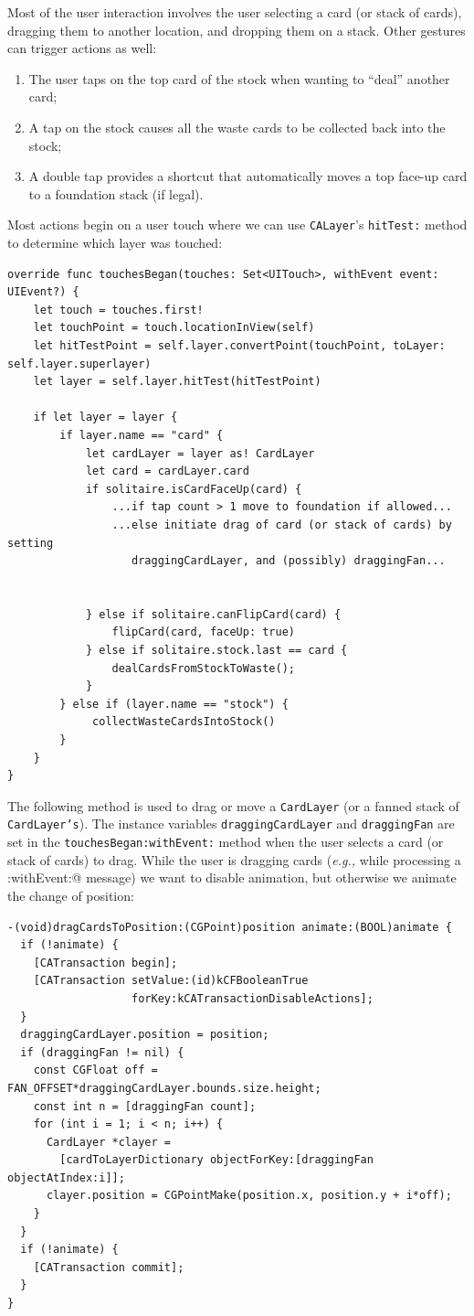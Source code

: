 \documentclass[11pt]{article}
\begin{document}
Most of the user interaction involves the user selecting a card (or stack
of cards), dragging them to another location, and dropping them on
a stack. Other gestures can trigger actions as well:
\begin{enumerate}
\item The user taps on the top card of the stock when wanting to
  ``deal'' another card;
\item A tap on the stock causes all the waste cards to be collected
  back into the stock;
\item A double tap provides a shortcut that automatically moves a
  top face-up card to a foundation stack (if legal).
\end{enumerate}
Most actions begin on a user touch where we can use 
{\tt CALayer}'s {\tt hitTest:} method to determine which layer was touched:
\begin{verbatim}
override func touchesBegan(touches: Set<UITouch>, withEvent event: UIEvent?) {
    let touch = touches.first!
    let touchPoint = touch.locationInView(self)
    let hitTestPoint = self.layer.convertPoint(touchPoint, toLayer: self.layer.superlayer)
    let layer = self.layer.hitTest(hitTestPoint)
        
    if let layer = layer {
        if layer.name == "card" {
            let cardLayer = layer as! CardLayer
            let card = cardLayer.card
            if solitaire.isCardFaceUp(card) {
                ...if tap count > 1 move to foundation if allowed...
                ...else initiate drag of card (or stack of cards) by setting
                   draggingCardLayer, and (possibly) draggingFan...


            } else if solitaire.canFlipCard(card) {
                flipCard(card, faceUp: true)
            } else if solitaire.stock.last == card {
                dealCardsFromStockToWaste();
            } 
        } else if (layer.name == "stock") {
             collectWasteCardsIntoStock()
        }
    }
}
\end{verbatim}
The following method is used to drag or move a {\tt CardLayer} (or a fanned stack of
{\tt CardLayer's}). The instance variables
{\tt draggingCardLayer} and {\tt draggingFan} are set
in the {\tt touchesBegan:withEvent:} method when the user selects
a card (or stack of cards) to drag.
While the user is dragging cards 
({\it e.g.,} while processing a \verb@touchesMoved:withEvent:@ message)
we want to disable animation, 
but otherwise we animate the change of position:
\begin{verbatim}
-(void)dragCardsToPosition:(CGPoint)position animate:(BOOL)animate {
  if (!animate) {
    [CATransaction begin];
    [CATransaction setValue:(id)kCFBooleanTrue
                   forKey:kCATransactionDisableActions];
  }
  draggingCardLayer.position = position;
  if (draggingFan != nil) {
    const CGFloat off = FAN_OFFSET*draggingCardLayer.bounds.size.height;
    const int n = [draggingFan count];
    for (int i = 1; i < n; i++) {
      CardLayer *clayer =
        [cardToLayerDictionary objectForKey:[draggingFan objectAtIndex:i]];
      clayer.position = CGPointMake(position.x, position.y + i*off);
    }
  }
  if (!animate) {
    [CATransaction commit];
  }
}
\end{verbatim}
\end{document}
